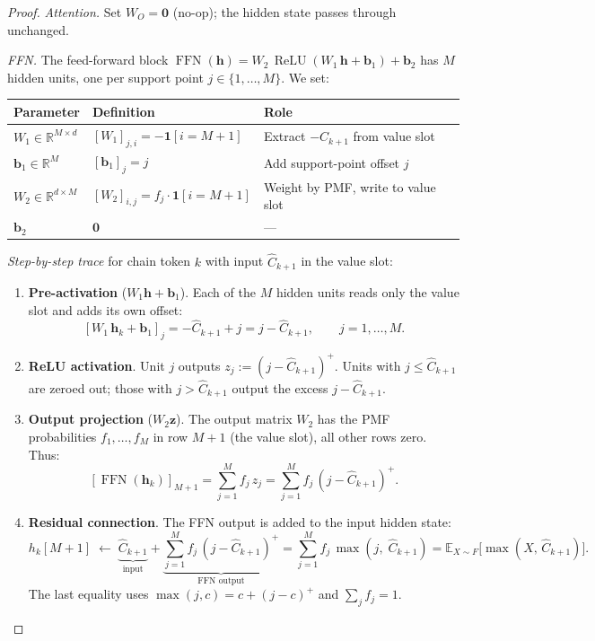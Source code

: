\begin{proof}
\emph{Attention.} Set $W_O = \mathbf{0}$ (no-op); the hidden state passes through unchanged.

\emph{FFN.} The feed-forward block $\operatorname{FFN}(\mathbf{h}) = W_2\,\operatorname{ReLU}(W_1\,\mathbf{h} + \mathbf{b}_1) + \mathbf{b}_2$ has $M$ hidden units, one per support point $j \in \{1,\ldots,M\}$. We set:

\begin{center}
\small
\renewcommand{\arraystretch}{1.3}
\begin{tabular}{lll}
\toprule
\textbf{Parameter} & \textbf{Definition} & \textbf{Role} \\
\midrule
$W_1 \in \mathbb{R}^{M \times d}$ & $[W_1]_{j,i} = -\mathbf{1}[i = M{+}1]$ & Extract $-C_{k+1}$ from value slot \\
$\mathbf{b}_1 \in \mathbb{R}^{M}$ & $[\mathbf{b}_1]_j = j$ & Add support-point offset $j$ \\
$W_2 \in \mathbb{R}^{d \times M}$ & $[W_2]_{i,j} = f_j \cdot \mathbf{1}[i = M{+}1]$ & Weight by PMF, write to value slot \\
$\mathbf{b}_2$ & $\mathbf{0}$ & --- \\
\bottomrule
\end{tabular}
\end{center}

\emph{Step-by-step trace} for chain token $k$ with input $\hat C_{k+1}$ in the value slot:

\begin{enumerate}
\item \textbf{Pre-activation} ($W_1 \mathbf{h} + \mathbf{b}_1$). Each of the $M$ hidden units reads only the value slot and adds its own offset:
\[
[W_1\,\mathbf{h}_k + \mathbf{b}_1]_j = -\hat C_{k+1} + j = j - \hat C_{k+1}, \qquad j = 1,\ldots,M.
\]
\item \textbf{ReLU activation}. Unit $j$ outputs $z_j := (j - \hat C_{k+1})^{+}$. Units with $j \le \hat C_{k+1}$ are zeroed out; those with $j > \hat C_{k+1}$ output the excess $j - \hat C_{k+1}$.

\item \textbf{Output projection} ($W_2 \mathbf{z}$). The output matrix $W_2$ has the PMF probabilities $f_1,\ldots,f_M$ in row $M{+}1$ (the value slot), all other rows zero. Thus:
\[
[\operatorname{FFN}(\mathbf{h}_k)]_{M+1} = \sum_{j=1}^{M} f_j\,z_j = \sum_{j=1}^{M} f_j\,(j - \hat C_{k+1})^{+}.
\]

\item \textbf{Residual connection}. The FFN output is added to the input hidden state:
\[
h_k[M{+}1] \;\leftarrow\; \underbrace{\hat C_{k+1}}_{\text{input}} + \underbrace{\sum_{j=1}^{M} f_j\,(j - \hat C_{k+1})^{+}}_{\text{FFN output}}
  = \sum_{j=1}^{M} f_j\,\max(j,\;\hat C_{k+1})
  = \mathbb{E}_{X \sim F}\!\big[\max(X,\,\hat C_{k+1})\big].
\]
The last equality uses $\max(j, c) = c + (j-c)^+$ and $\sum_j f_j = 1$.
\end{enumerate}


\end{proof}
